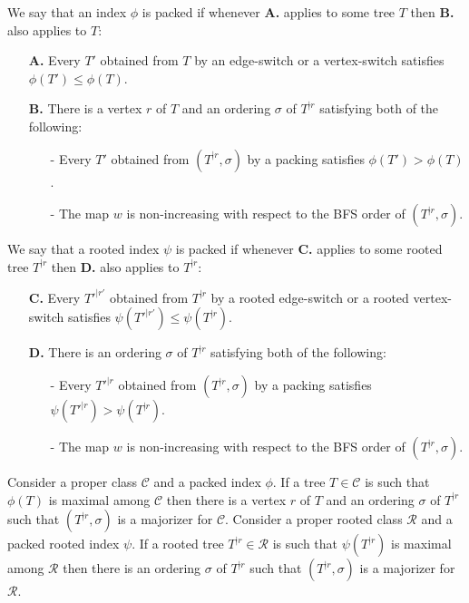 \documentclass[11 pt]{modarticle}
\newcommand{\wmap}{w}
\newcommand{\rtree}[2]{{#1}^{\lvert #2}}
\newcommand{\ortree}[3]{(\rtree{#1}{#2},{#3})}
\newcommand{\tclass}{\mathcal{C}}
\newcommand{\rtclass}{\mathcal{R}}
\begin{document}
\begin{defi}\label{def:packed}
We say that an index $\phi$ is packed if whenever \textbf{A.} applies to some tree $T$ then \textbf{B.} also applies to $T$:
\begin{itemize}
	\item[\textbf{A.}] Every $T'$ obtained from $T$ by an edge-switch or a vertex-switch satisfies $\phi(T') \leq \phi(T)$.
	\item[\textbf{B.}] There is a vertex $r$ of $T$ and an ordering $\sigma$ of $\rtree{T}{r}$ satisfying both of the following:
	\begin{itemize}
		\item[-] Every $T'$ obtained from $\ortree{T}{r}{\sigma}$ by a packing satisfies $\phi(T') > \phi(T)$.
		\item[-] The map $\wmap$ is non-increasing with respect to the BFS order of $\ortree{T}{r}{\sigma}$.
	\end{itemize}
\end{itemize}
\end{defi}

\begin{defi}
We say that a rooted index $\psi$ is packed if whenever \textbf{C.} applies to some rooted tree $\rtree{T}{r}$ then \textbf{D.} also applies to $\rtree{T}{r}$:
\begin{itemize}
	\item[\textbf{C.}] Every $\rtree{T'}{r'}$ obtained from $\rtree{T}{r}$ by a rooted edge-switch or a rooted vertex-switch satisfies $\psi(\rtree{T'}{r'}) \leq \psi(\rtree{T}{r})$.
	\item[\textbf{D.}] There is an ordering $\sigma$ of $\rtree{T}{r}$ satisfying both of the following:
	\begin{itemize}
		\item[-] Every $\rtree{T'}{r}$ obtained from $\ortree{T}{r}{\sigma}$ by a packing satisfies $\psi(\rtree{T'}{r}) > \psi(\rtree{T}{r})$.
		\item[-] The map $\wmap$ is non-increasing with respect to the BFS order of $\ortree{T}{r}{\sigma}$.
	\end{itemize}
\end{itemize}
\end{defi}

\begin{thm}\label{thm:maximal-is-majorizer}
Consider a proper class $\tclass$ and a packed index $\phi$. If a tree $T \in \tclass$ is such that $\phi(T)$ is maximal among $\tclass$ then there is a vertex $r$ of $T$ and an ordering $\sigma$ of $\rtree{T}{r}$ such that $\ortree{T}{r}{\sigma}$ is a majorizer for $\tclass$. Consider a proper rooted class $\rtclass$ and a packed rooted index $\psi$. If a rooted tree $\rtree{T}{r} \in \rtclass$ is such that $\psi(\rtree{T}{r})$ is maximal among $\rtclass$ then there is an ordering $\sigma$ of $\rtree{T}{r}$ such that $\ortree{T}{r}{\sigma}$ is a majorizer for $\rtclass$. 
\end{thm}
\end{document}

